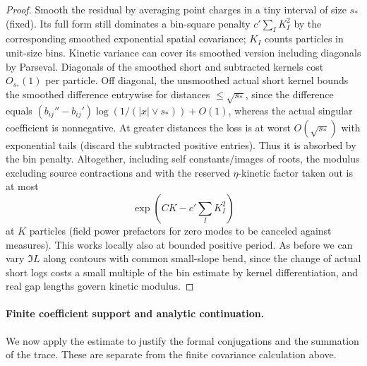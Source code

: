 \begin{proof}
Smooth the residual by averaging point charges in a tiny interval of size \(s_*\) (fixed). Its full form still dominates a bin-square penalty \(c'\sum_I K_I^2\) by the corresponding smoothed exponential spatial covariance; \(K_I\) counts particles in unit-size bins. Kinetic variance can cover its smoothed version including diagonals by Parseval. Diagonals of the smoothed short and subtracted kernels cost \(O_{s_*}(1)\) per particle. Off diagonal, the unsmoothed actual short kernel bounds the smoothed difference entrywise for distances \(\le\sqrt{s_*}\), since the difference equals \((b_{ij}''-b_{ij}')\log(1/(|x|\vee s_*))+O(1)\), whereas the actual singular coefficient is nonnegative. At greater distances the loss is at worst \(O(\sqrt{s_*})\) with exponential tails (discard the subtracted positive entries). Thus it is absorbed by the bin penalty. Altogether, including self constants/images of roots, the modulus excluding source contractions and with the reserved \(\eta\)-kinetic factor taken out is at most
\[
 \exp(CK-c'\sum_I K_I^2)
\]
at \(K\) particles (field power prefactors for zero modes to be canceled against measures). This works locally also at bounded positive period. As before we can vary \(\Im L\) along contours with common small-slope bend, since the change of actual short logs costs a small multiple of the bin estimate by kernel differentiation, and real gap lengths govern kinetic modulus.

\end{proof}

\paragraph{Finite coefficient support and analytic continuation.}
We now apply the estimate to justify the formal conjugations and the
summation of the trace. These are separate from the finite covariance
calculation above.

